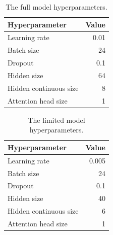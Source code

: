         \begin{table}[ht!]
        \begin{center}
        \caption{The full model hyperparameters.
        \label{tab:full_params}}
        \vspace{0.5cm}
        \begin{tabular}{|l|r|}
        \hline
        \textbf{Hyperparameter} & \textbf{Value} \\ \hline
        Learning rate            & 0.01         \\ \hline
        Batch size              & 24            \\ \hline
        Dropout                 & 0.1            \\ \hline
        Hidden size            & 64         \\ \hline
        Hidden continuous size & 8         \\ \hline
        Attention head size    & 1         \\ \hline
        \end{tabular}
        
        \end{center}
        \end{table}
        
        \begin{table}[ht!]
        \begin{center}
        \caption{The limited model hyperparameters.
        \label{tab:lim_params}}
        \vspace{0.5cm}
        \begin{tabular}{|l|r|}
        \hline
        \textbf{Hyperparameter} & \textbf{Value} \\ \hline
        Learning rate            & 0.005         \\ \hline
        Batch size              & 24            \\ \hline
        Dropout                 & 0.1            \\ \hline
        Hidden size            & 40         \\ \hline
        Hidden continuous size & 6         \\ \hline
        Attention head size    & 1         \\ \hline
        \end{tabular}
        
        \end{center}
        \end{table}
    
